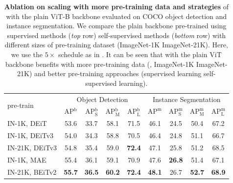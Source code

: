 \begin{table}[t]
    \centering
    \footnotesize
    {
    \begin{tabular}{l|cccc|cccc}
    \multirow{2}{*}{pre-train} & \multicolumn{4}{c|}{Object Detection} & \multicolumn{4}{c}{Instance Segmentation} \\
    & AP$^\text{b}$ & AP$^\text{b}_\text{S}$ & AP$^\text{b}_\text{M}$ & AP$^\text{b}_\text{L}$ & $\text{AP}^\text{m}$ & $\text{AP}^\text{m}_\text{S}$ & $\text{AP}^\text{m}_\text{M}$ & $\text{AP}^\text{m}_\text{L}$ \\
    \shline
    IN-1K, DEiT & 53.6 & 33.7 & 58.1 & 71.5 & 46.1 & 24.5 & 50.4 & 67.2 \\
    IN-1K, DEiTv3 & 54.0 & 34.3 & 58.8 & 70.5 & 46.4 & 24.8 & 51.1 & 66.7 \\
    IN-21K, DEiTv3 & 54.8 & 35.4 & 59.0 & {\bf 72.4} & 47.1 & 25.8 & 51.2 & 68.5 \\
    \hline
    IN-1K, MAE & 55.4 & 36.1 & 59.1 & 70.9 & 47.6 & {\bf 26.8} & 51.4 & 67.1 \\
    IN-21K, BEiTv2 & {\bf 55.7} & {\bf 36.5} & {\bf 60.2} & {\bf 72.4} & {\bf 48.1} & 26.7 & {\bf 52.7} & {\bf 68.9} \\
    \end{tabular}
    }
    \caption{
        \textbf{Ablation on scaling with more pre-training data and strategies} of \ours with the plain ViT-B backbone evaluated on COCO object detection and instance segmentation. We compare the plain backbone pre-trained using supervised methods (\emph{top} row) \vs self-supervised methods (\emph{bottom} row) with different sizes of pre-training dataset (ImageNet-1K \vs ImageNet-21K). Here, we use the $5\times$ schedule as in \cite{nguyen2022boxer}. It can be seen that \ours with the plain ViT backbone benefits with more pre-training data (\eg, ImageNet-1K \vs ImageNet-21K) and better pre-training approaches (supervised learning \vs self-supervised learning).
    }\label{tab:pretrain}
\end{table}


